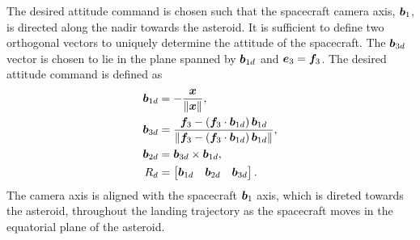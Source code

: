 The desired attitude command is chosen such that the spacecraft camera axis, \( \bm{b}_1 \), is directed along the nadir towards the asteroid.
It is sufficient to define two orthogonal vectors to uniquely determine the attitude of the spacecraft.
The \( \bm{b}_{3d} \) vector is chosen to lie in the plane spanned by \(\bm{b}_{1d} \) and \( \bm{e}_3 = \bm{f}_3 \).
The desired attitude command is defined as
\begin{align}
    \bm{b}_{1d} &= - \frac{\bm{x}}{\left\| \bm{x} \right\|} , \\
    \bm{b}_{3d} &= \frac{\bm{f}_3 - \left( \bm{f}_3 \cdot \bm{b}_{1d} \right) \bm{b}_{1d}}{\left\| \bm{f}_3 - \left( \bm{f}_3 \cdot \bm{b}_{1d} \right) \bm{b}_{1d} \right\|}, \\
    \bm{b}_{2d} &= \bm{b}_{3d} \times \bm{b}_{1d} , \\
R_d &= \begin{bmatrix} \bm{b}_{1d} & \bm{b}_{2d} & \bm{b}_{3d} \end{bmatrix}.
\end{align}
The camera axis is aligned with the spacecraft \( \bm{b}_ 1 \) axis, which is direted towards the asteroid, throughout the landing trajectory as the spacecraft moves in the equatorial plane of the asteroid.

